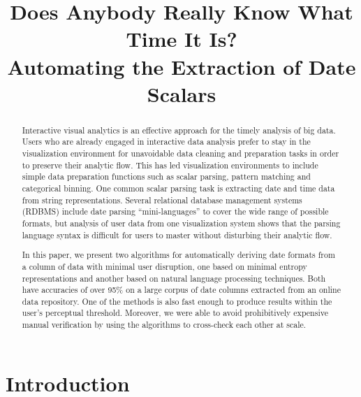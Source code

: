 \documentclass{sig-alternate-05-2015}
\newcommand{\vidya}[1]{\textcolor{red}{(vidya: #1)}}
\begin{document}
\title{Does Anybody Really Know What Time It Is?\\
Automating the Extraction of Date Scalars}


\maketitle
\begin{abstract}
Interactive visual analytics is an effective approach for the timely analysis of big data. Users who are already engaged in interactive data analysis prefer to stay in the visualization environment for unavoidable data cleaning and preparation tasks in order to preserve their analytic flow. This has led visualization environments to include simple data preparation functions such as scalar parsing, pattern matching and categorical binning. One common scalar parsing task is extracting date and time data from string representations. Several relational database management systems (RDBMS) include date parsing ``mini-languages'' to cover the wide range of possible formats, but analysis of user data from one visualization system shows that the parsing language syntax is difficult for users to master without disturbing their analytic flow.

In this paper, we present two algorithms for automatically deriving date formats from a column of data with minimal user disruption, one based on minimal entropy representations and another based on natural language processing techniques. Both have accuracies of over 95\% on a large corpus of date columns extracted from an online data repository. One of the methods is also fast enough to produce results within the user's perceptual threshold. Moreover, we were able to avoid prohibitively expensive manual verification by using the algorithms to cross-check each other at scale.
\end{abstract}



\section{Introduction} \label{sec:intro}

\end{document}
